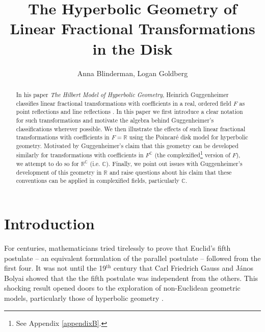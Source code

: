\documentclass[12pt]{article}
\title{The Hyperbolic Geometry of Linear Fractional Transformations in the \poincare Disk}
\author{Anna Blinderman, Logan Goldberg}
\date{}
\newcommand{\R}{\mathbb{R}}
\newcommand{\C}{\mathbb{C}}
\newcommand{\fc}{F^{\C}}
\newcommand{\poincare}{Poincar\'{e} }
\theoremstyle{plain}
\theoremstyle{definition}
\begin{document}
\maketitle

\begin{abstract}
In his paper \textit{The Hilbert Model of Hyperbolic Geometry}, Heinrich Guggenheimer classifies linear fractional transformations with coefficients in a real, ordered field $F$ as point reflections and line reflections \cite{guggen_paper}. In this paper we first introduce a clear notation for such transformations and motivate the algebra behind Guggenheimer's classifications wherever possible. We then illustrate the effects of such linear fractional transformations with coefficients in $F = \R$ using the \poincare disk model for hyperbolic geometry. Motivated by Guggenheimer's claim that this geometry can be developed similarly for transformations with coefficients in $\fc$ (the complexified\footnote{See Appendix \ref{appendixB}.} version of $F$), we attempt to do so for $\R^{\C}$ (i.e. $\C$). Finally, we point out issues with Guggenheimer's development of this geometry in $\R$ and raise questions about his claim that these conventions can be applied in complexified fields, particularly $\C$.
\end{abstract}

\section{Introduction}

\hspace{10mm} For centuries, mathematicians tried tirelessly to prove that Euclid's fifth postulate -- an equivalent formulation of the parallel postulate -- followed from the first four. It was not until the 19$^{\text{th}}$ century that Carl Friedrich Gauss and J\'{a}nos Bolyai showed that the the fifth postulate was independent from the others. This shocking result opened doors to the exploration of non-Euclidean geometric models, particularly those of hyperbolic geometry \cite{hartshorne}.
\end{document}
